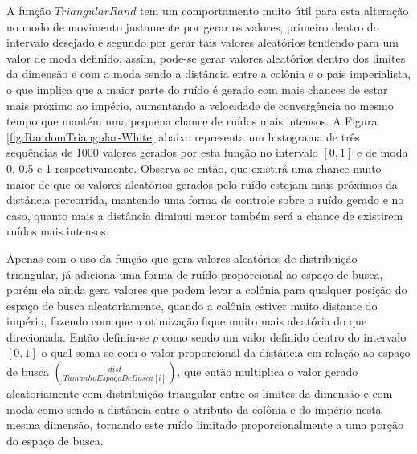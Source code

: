 A função \(TriangularRand\) tem um comportamento muito útil para esta alteração no modo de movimento justamente por gerar os valores, primeiro dentro do intervalo desejado e segundo por gerar tais valores aleatórios tendendo para um valor de moda definido, assim, pode-se gerar valores aleatórios dentro dos limites da dimensão e com a moda sendo a distância entre a colônia e o país imperialista, o que implica que a maior parte do ruído é gerado com mais chances de estar mais próximo ao império, aumentando a velocidade de convergência ao mesmo tempo que mantém uma pequena chance de ruídos mais intensos. A Figura \ref{fig:RandomTriangular-White} abaixo representa um histograma de três sequências de 1000 valores gerados por esta função no intervalo \(\left[0,1\right]\) e de moda 0, 0.5 e 1 respectivamente. Observa-se então, que existirá uma chance muito maior de que os valores aleatórios gerados pelo ruído estejam mais próximos da distância percorrida, mantendo uma forma de controle sobre o ruído gerado e no caso, quanto mais a distância diminui menor também será a chance de existirem ruídos mais intensos. 
	
Apenas com o uso da função que gera valores aleatórios de distribuição triangular, já adiciona uma forma de ruído proporcional ao espaço de busca, porém ela ainda gera valores que podem levar a colônia para qualquer posição do espaço de busca aleatoriamente, quando a colônia estiver muito distante do império, fazendo com que a otimização fique muito mais aleatória do que direcionada. Então definiu-se \(p\) como sendo um valor definido dentro do intervalo \(\left[0,1\right]\) o qual soma-se com o valor proporcional da distância em relação ao espaço de busca \(\left(\frac{dist}{TamanhoEspaçoDeBusca[i]}\right)\), que então multiplica o valor gerado aleatoriamente com distribuição triangular entre os limites da dimensão e com moda como sendo a distância entre o atributo da colônia e do império nesta mesma dimensão, tornando este ruído limitado proporcionalmente a uma porção do espaço de busca. 
    
